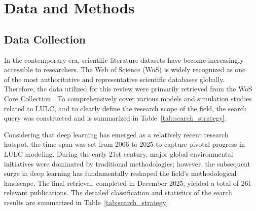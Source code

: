\documentclass[]{interact}
\theoremstyle{plain}%
\theoremstyle{definition}
\theoremstyle{remark}
\begin{document}
\section{Data and Methods}

\subsection{Data Collection}
\label{sec:data_collection} 
In the contemporary era, scientific literature datasets have become increasingly accessible to researchers. The Web of Science (WoS) is widely recognized as one of the most authoritative and representative scientific databases globally. Therefore, the data utilized for this review were primarily retrieved from the WoS Core Collection \citep{11}. To comprehensively cover various models and simulation studies related to LULC, and to clearly define the research scope of the field, the search query was constructed and is summarized in Table~\ref{tab:search_strategy}. 

Considering that deep learning has emerged as a relatively recent research hotspot, the time span was set from 2006 to 2025 to capture pivotal progress in LULC modeling. During the early 21st century, major global environmental initiatives were dominated by traditional methodologies; however, the subsequent surge in deep learning has fundamentally reshaped the field's methodological landscape. The final retrieval, completed in December 2025, yielded a total of 261 relevant publications. The detailed classification and statistics of the search results are summarized in Table~\ref{tab:search_strategy}.
\end{document}
